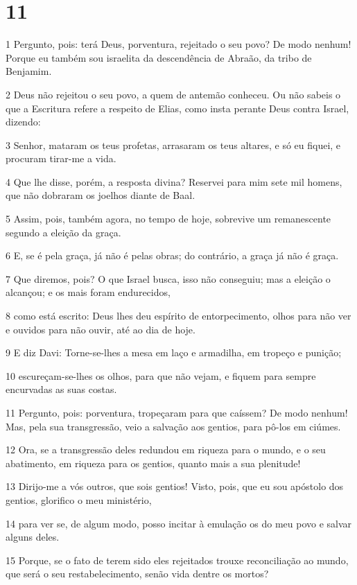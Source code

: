 \chapter{11}

\par 1 Pergunto, pois: terá Deus, porventura, rejeitado o seu povo? De modo nenhum! Porque eu também sou israelita da descendência de Abraão, da tribo de Benjamim.
\par 2 Deus não rejeitou o seu povo, a quem de antemão conheceu. Ou não sabeis o que a Escritura refere a respeito de Elias, como insta perante Deus contra Israel, dizendo:
\par 3 Senhor, mataram os teus profetas, arrasaram os teus altares, e só eu fiquei, e procuram tirar-me a vida.
\par 4 Que lhe disse, porém, a resposta divina? Reservei para mim sete mil homens, que não dobraram os joelhos diante de Baal.
\par 5 Assim, pois, também agora, no tempo de hoje, sobrevive um remanescente segundo a eleição da graça.
\par 6 E, se é pela graça, já não é pelas obras; do contrário, a graça já não é graça.
\par 7 Que diremos, pois? O que Israel busca, isso não conseguiu; mas a eleição o alcançou; e os mais foram endurecidos,
\par 8 como está escrito: Deus lhes deu espírito de entorpecimento, olhos para não ver e ouvidos para não ouvir, até ao dia de hoje.
\par 9 E diz Davi: Torne-se-lhes a mesa em laço e armadilha, em tropeço e punição;
\par 10 escureçam-se-lhes os olhos, para que não vejam, e fiquem para sempre encurvadas as suas costas.
\par 11 Pergunto, pois: porventura, tropeçaram para que caíssem? De modo nenhum! Mas, pela sua transgressão, veio a salvação aos gentios, para pô-los em ciúmes.
\par 12 Ora, se a transgressão deles redundou em riqueza para o mundo, e o seu abatimento, em riqueza para os gentios, quanto mais a sua plenitude!
\par 13 Dirijo-me a vós outros, que sois gentios! Visto, pois, que eu sou apóstolo dos gentios, glorifico o meu ministério,
\par 14 para ver se, de algum modo, posso incitar à emulação os do meu povo e salvar alguns deles.
\par 15 Porque, se o fato de terem sido eles rejeitados trouxe reconciliação ao mundo, que será o seu restabelecimento, senão vida dentre os mortos?
